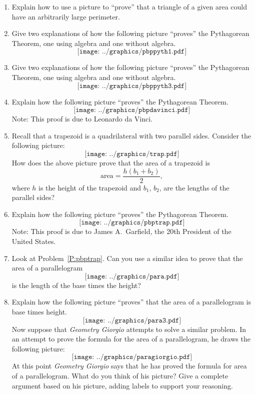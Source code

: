 \begin{problems}
\begin{enumerate}
\item Explain how to use a picture to ``prove'' that a triangle of a
  given area could have an arbitrarily large perimeter.

\item Give two explanations of how the following picture ``proves''
  the Pythagorean Theorem, one using algebra and one without algebra. 
\[
\texttt{[image: ../graphics/pbppyth1.pdf]}
\]
\item Give two explanations of how the following picture ``proves''
  the Pythagorean Theorem, one using algebra and one without algebra. 
\[
\texttt{[image: ../graphics/pbppyth3.pdf]}
\]
\item Explain how the following picture ``proves'' the Pythagorean Theorem.
\[
\texttt{[image: ../graphics/pbpdavinci.pdf]}
\]
Note: This proof is due to Leonardo da Vinci.
\item\label{P:pbptrap} Recall that a trapezoid is a quadrilateral with two parallel sides. Consider the following picture:
\[
\texttt{[image: ../graphics/trap.pdf]}
\]
How does the above picture prove that the area of a trapezoid is
\[
\mathrm{area}= \frac{h(b_1 + b_2)}{2},
\]
where $h$ is the height of the trapezoid and $b_1$, $b_2$, are the lengths of the parallel sides?
\item Explain how the following picture ``proves'' the Pythagorean Theorem.
\[
\texttt{[image: ../graphics/pbptrap.pdf]}
\]
Note: This proof is due to James A.\ Garfield, the 20th President of the United States.
\item Look at Problem~\ref{P:pbptrap}. Can you use a similar idea
  to prove that the area of a parallelogram
\[
\texttt{[image: ../graphics/para.pdf]}
\]
is the length of the base times the height?
\item Explain how the following picture ``proves'' that the area of a
  parallelogram is base times height.
\[
\texttt{[image: ../graphics/para3.pdf]}
\]
Now suppose that \textit{Geometry Giorgio} attempts to
solve a similar problem. In an attempt to prove the formula for the
area of a parallelogram, he draws the following
picture:
\[
\texttt{[image: ../graphics/paragiorgio.pdf]}
\]
At this point \textit{Geometry Giorgio} says that he has proved the
formula for area of a parallelogram. What do you think of his picture?
Give a complete argument based on his picture, adding labels to support your reasoning. 


\end{enumerate}
\end{problems}

